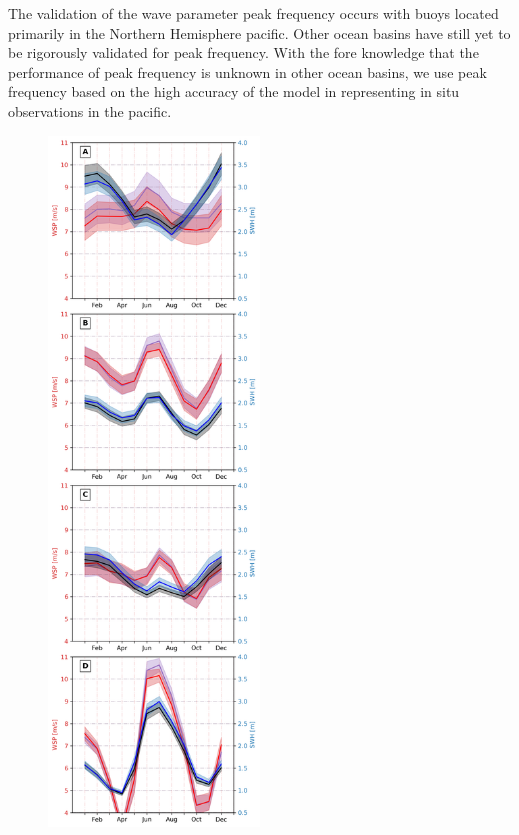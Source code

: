 \documentclass[draft,linenumbers]{agujournal2018}
\begin{document}
The validation of the wave parameter peak frequency occurs with buoys located primarily in the Northern Hemisphere pacific. Other ocean basins have still yet to be rigorously validated for peak frequency. With the fore knowledge that the performance of peak frequency is unknown in other ocean basins, we use peak frequency based on the high accuracy of the model in representing in situ observations in the pacific. 


\begin{figure}[tbh]
\centering
\begin{minipage}{.5\textwidth}
  \centering
  \includegraphics[width=0.5\textwidth]{figs/regional_climatologies/SWARs_reg_clima_4x4_nh_ww3.png}

\end{minipage}
\end{figure}
\end{document}
